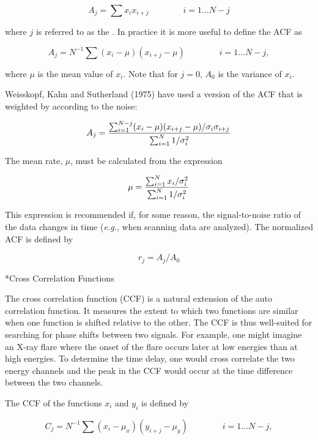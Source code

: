 $$A_j = \sum x_i x_{i+j}\qquad\qquad   i = 1 \ldots N-j$$

{\list

where $j$ is referred to as the .  
In practice it is more useful to define the ACF as

}

$$A_j = N^{-1} \sum (x_{i}-\mu)(x_{i+j} - \mu) \qquad\qquad  i=1
\ldots N-j,$$

{\list

where $\mu$ is the mean value of $x_i$.  Note that for $j = 0$,
$A_0$ is the
variance of $x_i$.

Weisskopf, Kahn and Sutherland (1975) have used a version
of the ACF that is weighted by according to the noise:

}

$$A_j = {{\sum_{i=1}^{N-j} (x_i - \mu) (x_{i+j}-\mu)/
 \sigma_i\sigma_{i+j}} \over 
{\sum_{i=1}^N 1/\sigma_i^2}}$$

{\list

The mean rate, $\mu$, must be calculated from the expression

}

$$\mu ={\sum^N_{i=1} x_i/\sigma^2_i \over \sum^N_{i=1} 1/\sigma_i^2}$$

{\list

This expression is recommended if, for some reason, the signal-to-noise ratio
of the data changes in time ({\it e.g.}, when scanning data are analyzed).  The
normalized ACF is defined by

}

$$r_j = A_j/A_0$$


\**Cross Correlation Functions

{\list

The cross correlation function (CCF) is a natural extension of the auto
correlation function.  It measures the extent to which two functions are
similar when one function is shifted relative to the other.  The CCF is thus
well-suited for searching for phase shifts between two signals.  For example,
one might imagine an X-ray flare where the onset of the flare occurs later at
low energies than at high energies.  To determine the time delay, one would
cross correlate the two energy channels and the peak in the CCF would occur at
the time difference between the two channels.

The CCF of the functions $x_i$ and $y_i$ is defined by

}

$$C_j = N^{-1} \sum (x_i-\mu_x)(y_{i+j}-\mu_y)
\qquad\qquad i = 1 \ldots N-j,$$


